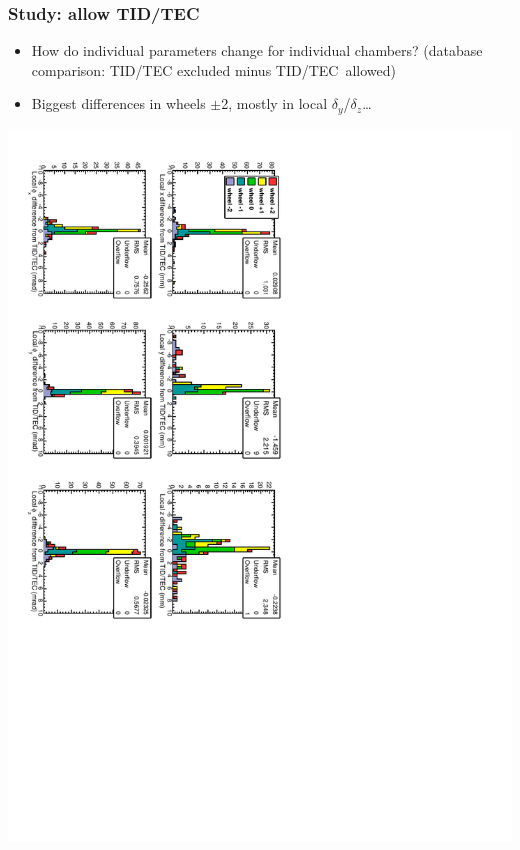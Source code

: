 \documentclass[compress]{beamer}
\begin{document}
\begin{frame}
\frametitle{Study: allow TID/TEC}

\begin{itemize}
\item How do individual parameters change for individual chambers? (database comparison: TID/TEC excluded minus \mbox{TID/TEC allowed)\hspace{-1 cm}}
\item Biggest differences in wheels $\pm$2, mostly in local $\delta_y$/$\delta_z$\ldots
\end{itemize}

\includegraphics[height=\linewidth, angle=90]{data_effect_of_TIDTEC_all.pdf}
\end{frame}
\end{document}
